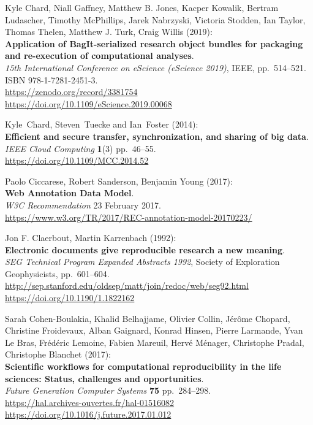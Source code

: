 \begin{thebibliography}{9}
Kyle Chard, Niall Gaffney, Matthew B. Jones, Kacper Kowalik,
Bertram Ludascher, Timothy McPhillips, Jarek Nabrzyski, Victoria
Stodden, Ian Taylor, Thomas Thelen, Matthew J. Turk, Craig Willis
(2019):\\
\textbf{Application of BagIt-serialized research object bundles for
packaging and re-execution of computational analyses}.\\
\emph{15th International Conference on eScience (eScience 2019)}, IEEE,
pp.~514--521.\\
ISBN 978-1-7281-2451-3.\\
\url{https://zenodo.org/record/3381754}\\
\url{https://doi.org/10.1109/eScience.2019.00068}

Kyle~Chard, Steven~Tuecke and Ian~Foster (2014):\\
\textbf{Efficient and secure transfer, synchronization, and sharing of
big data}.\\
\emph{IEEE Cloud Computing} \textbf{1}(3) pp.~46--55.\\
\url{https://doi.org/10.1109/MCC.2014.52}

Paolo Ciccarese, Robert Sanderson, Benjamin Young (2017):\\
\textbf{Web Annotation Data Model}.\\
\emph{W3C Recommendation} 23 February 2017.\\
\url{https://www.w3.org/TR/2017/REC-annotation-model-20170223/}

Jon F. Claerbout, Martin Karrenbach (1992):\\
\textbf{Electronic documents give reproducible research a new
meaning}.\\
\emph{SEG Technical Program Expanded Abstracts 1992}, Society of
Exploration Geophysicists, pp.~601--604.\\
\url{http://sep.stanford.edu/oldsep/matt/join/redoc/web/seg92.html}\\
\url{https://doi.org/10.1190/1.1822162}

Sarah Cohen-Boulakia, Khalid Belhajjame, Olivier Collin, Jérôme
Chopard, Christine Froidevaux, Alban Gaignard, Konrad Hinsen, Pierre
Larmande, Yvan Le Bras, Frédéric Lemoine, Fabien Mareuil, Hervé Ménager,
Christophe Pradal, Christophe Blanchet (2017):\\
\textbf{Scientific workflows for computational reproducibility in the
life sciences: Status, challenges and opportunities}.\\
\emph{Future Generation Computer Systems} \textbf{75} pp.~284--298.\\
\url{https://hal.archives-ouvertes.fr/hal-01516082}\\
\url{https://doi.org/10.1016/j.future.2017.01.012}


\end{thebibliography}
